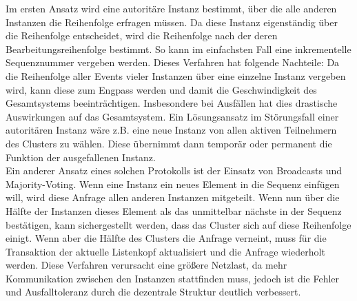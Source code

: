Im ersten Ansatz wird eine autoritäre Instanz bestimmt, über die alle anderen Instanzen die Reihenfolge erfragen müssen. Da diese Instanz eigenständig über die Reihenfolge entscheidet, wird die Reihenfolge nach der deren Bearbeitungsreihenfolge bestimmt. So kann im einfachsten Fall eine inkrementelle Sequenznummer vergeben werden. Dieses Verfahren hat folgende Nachteile: Da die Reihenfolge aller Events vieler Instanzen über eine einzelne Instanz vergeben wird, kann diese zum Engpass werden und damit die Geschwindigkeit des Gesamtsystems beeinträchtigen. Insbesondere bei Ausfällen hat dies drastische Auswirkungen auf das Gesamtsystem. Ein Lösungsansatz im Störungsfall einer autoritären Instanz wäre z.B. eine neue Instanz von allen aktiven Teilnehmern des Clusters zu wählen. Diese übernimmt dann temporär oder permanent die Funktion der ausgefallenen Instanz.\cite{565838}\\
Ein anderer Ansatz eines solchen Protokolls ist der Einsatz von Broadcasts und Majority-Voting. Wenn eine Instanz ein neues Element in die Sequenz einfügen will, wird diese Anfrage allen anderen Instanzen mitgeteilt. Wenn nun über die Hälfte der Instanzen dieses Element als das unmittelbar nächste in der Sequenz bestätigen, kann sichergestellt werden, dass das Cluster sich auf diese Reihenfolge einigt. Wenn aber die Hälfte des Clusters die Anfrage verneint, muss für die Transaktion der aktuelle Listenkopf aktualisiert und die Anfrage wiederholt werden. Diese Verfahren verursacht eine größere Netzlast, da mehr Kommunikation zwischen den Instanzen stattfinden muss, jedoch ist die Fehler und Ausfalltoleranz durch die dezentrale Struktur deutlich verbessert.\cite{1041682}\\

